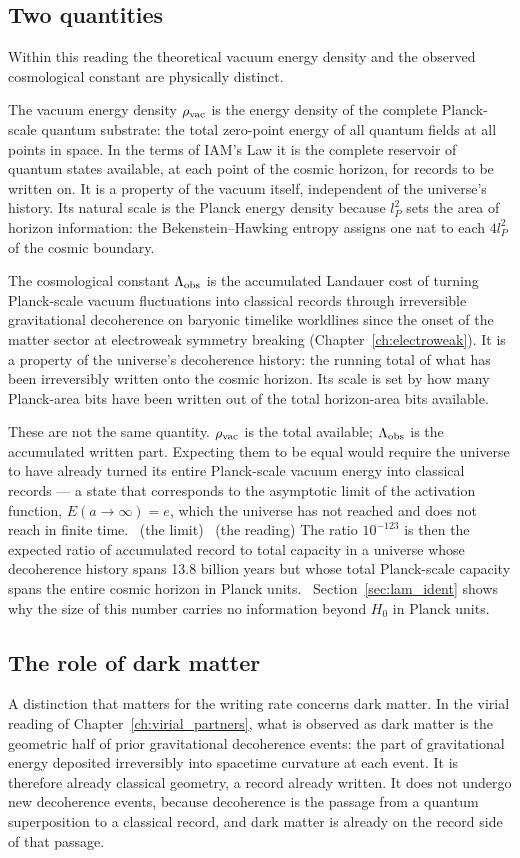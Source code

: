 \subsection{Two quantities}
Within this reading the theoretical vacuum energy density and the observed cosmological constant are physically distinct. \interp

The vacuum energy density $\rho_{\rm vac}$ is the energy density of the complete Planck-scale quantum substrate: the total zero-point
energy of all quantum fields at all points in space. In the terms of IAM's Law it is the complete reservoir of quantum states
available, at each point of the cosmic horizon, for records to be written on. It is a property of the vacuum itself, independent of
the universe's history. Its natural scale is the Planck energy density because $l_P^2$ sets the area of horizon information: the
Bekenstein--Hawking entropy assigns one nat to each $4l_P^2$ of the cosmic boundary. \interp

The cosmological constant $\Lambda_{\rm obs}$ is the accumulated Landauer cost of turning Planck-scale vacuum fluctuations into
classical records through irreversible gravitational decoherence on baryonic timelike worldlines since the onset of the matter sector
at electroweak symmetry breaking (Chapter~\ref{ch:electroweak}). It is a property of the universe's decoherence history: the running
total of what has been irreversibly written onto the cosmic horizon. Its scale is set by how many Planck-area bits have been written
out of the total horizon-area bits available. \interp

These are not the same quantity. $\rho_{\rm vac}$ is the total available; $\Lambda_{\rm obs}$ is the accumulated written part. Expecting
them to be equal would require the universe to have already turned its entire Planck-scale vacuum energy into classical records --- a
state that corresponds to the asymptotic limit of the activation function, $E(a\to\infty)=e$, which the universe has not reached and
does not reach in finite time. \calc\ (the limit) \interp\ (the reading) The ratio $10^{-123}$ is then the expected ratio of
accumulated record to total capacity in a universe whose decoherence history spans 13.8 billion years but whose total Planck-scale
capacity spans the entire cosmic horizon in Planck units. \interp\ Section~\ref{sec:lam_ident} shows why the size of this number
carries no information beyond $H_0$ in Planck units.

\subsection{The role of dark matter}\label{sec:lam_dm}
A distinction that matters for the writing rate concerns dark matter. In the virial reading of Chapter~\ref{ch:virial_partners}, what
is observed as dark matter is the geometric half of prior gravitational decoherence events: the part of gravitational energy deposited
irreversibly into spacetime curvature at each event. It is therefore already classical geometry, a record already written. It does not
undergo new decoherence events, because decoherence is the passage from a quantum superposition to a classical record, and dark matter
is already on the record side of that passage. \interp

